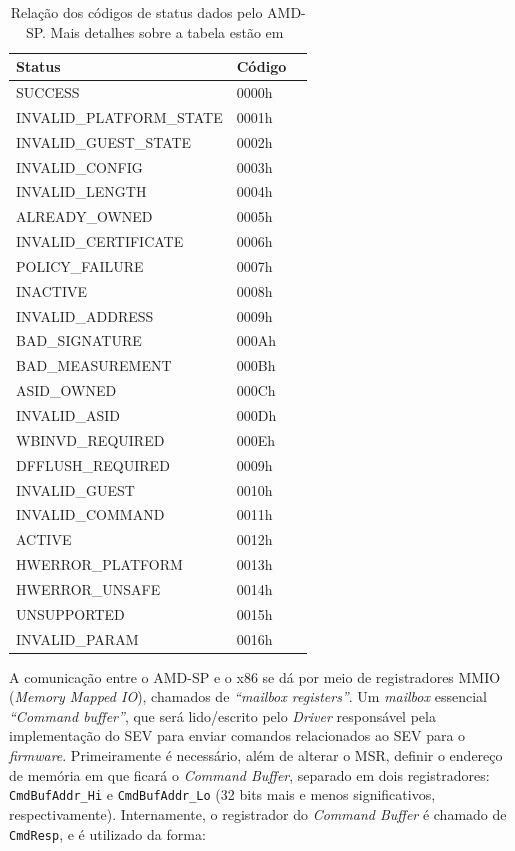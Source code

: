 \documentclass{report}
\begin{document}
\begin{table}[h]
    \centering
    \begin{tabular}{lll}
        \toprule
        Status  & Código\\
        \midrule
        SUCCESS & 0000h\\
        INVALID\_PLATFORM\_STATE & 0001h\\
        INVALID\_GUEST\_STATE & 0002h\\
        INVALID\_CONFIG & 0003h\\
        INVALID\_LENGTH & 0004h\\
        ALREADY\_OWNED & 0005h\\
        INVALID\_CERTIFICATE & 0006h\\
        POLICY\_FAILURE & 0007h\\
        INACTIVE & 0008h\\
        INVALID\_ADDRESS & 0009h\\
        BAD\_SIGNATURE & 000Ah\\
        BAD\_MEASUREMENT & 000Bh\\
        ASID\_OWNED & 000Ch\\
        INVALID\_ASID & 000Dh\\
        WBINVD\_REQUIRED & 000Eh\\
        DFFLUSH\_REQUIRED & 0009h\\
        INVALID\_GUEST & 0010h\\
        INVALID\_COMMAND & 0011h\\
        ACTIVE & 0012h\\
        HWERROR\_PLATFORM & 0013h\\
        HWERROR\_UNSAFE & 0014h\\
        UNSUPPORTED & 0015h\\
        INVALID\_PARAM & 0016h\\
        \bottomrule
    \end{tabular}
    \caption{Relação dos códigos de status dados pelo AMD-SP\@. Mais detalhes
             sobre a tabela estão
             em~\cite{sev-api-doc}}\label{cmdresp-status-code}
\end{table}

A comunicação entre o AMD-SP e o x86 se dá por meio de registradores MMIO
(\textit{Memory Mapped IO}), chamados de \textit{``mailbox registers''}. Um
\textit{mailbox} essencial \textit{``Command buffer''}, que será lido/escrito
pelo \textit{Driver} responsável pela implementação do SEV para enviar comandos
relacionados ao SEV para o \textit{firmware}. Primeiramente é necessário, além
de alterar o MSR, definir o endereço de memória em que ficará o \textit{Command
Buffer}, separado em dois registradores: \texttt{CmdBufAddr\_Hi} e
\texttt{CmdBufAddr\_Lo} (32 bits mais e menos significativos, respectivamente).
Internamente, o registrador do \textit{Command Buffer} é chamado de
\texttt{CmdResp}, e é utilizado da forma:
\end{document}
